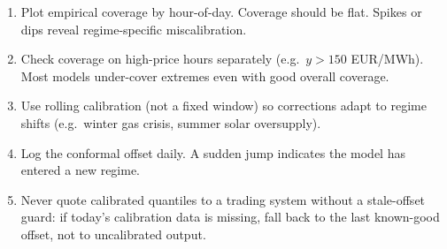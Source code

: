 \begin{enumerate}
  \item Plot empirical coverage by hour-of-day. Coverage should be flat.
        Spikes or dips reveal regime-specific miscalibration.
  \item Check coverage on high-price hours separately (e.g.\ $y > 150$ EUR/MWh).
        Most models under-cover extremes even with good overall coverage.
  \item Use rolling calibration (not a fixed window) so corrections adapt
        to regime shifts (e.g.\ winter gas crisis, summer solar oversupply).
  \item Log the conformal offset daily. A sudden jump indicates the model
        has entered a new regime.
  \item Never quote calibrated quantiles to a trading system without a
        stale-offset guard: if today's calibration data is missing,
        fall back to the last known-good offset, not to uncalibrated output.
\end{enumerate}
